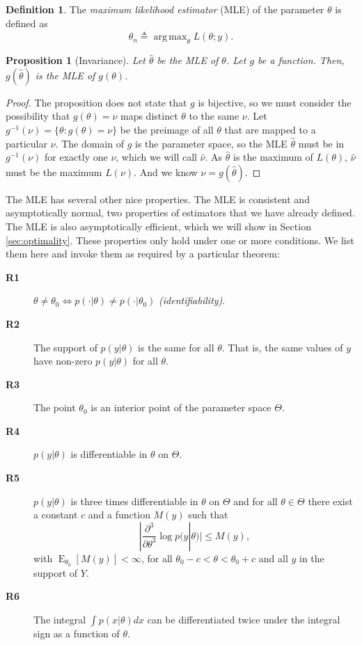 \documentclass{book}
\theoremstyle{plain}%
\newtheorem{proposition}{Proposition}[section]
\theoremstyle{definition}
\newtheorem{definition}{Definition}[section]
\DeclareMathOperator{\E}{E}
\newlength{\arrow}
\DeclareMathOperator*{\argmax}{arg\,max}
\begin{document}
\begin{definition}
The \textit{maximum likelihood estimator} (MLE) of the parameter $\theta$ is defined as $$\hat{\theta}_n \triangleq \displaystyle\argmax_\theta L(\theta;y).$$
\end{definition}

\begin{proposition}[Invariance]
Let $\hat{\theta}$ be the MLE of $\theta$. Let $g$ be a function. Then, $g(\hat{\theta})$ is the MLE of $g(\theta)$.
\end{proposition}

\begin{proof}
The proposition does not state that $g$ is bijective, so we must consider the possibility that $g(\theta) = \nu$ maps distinct $\theta$ to the same $\nu$. Let $g^{-1}(\nu) = \{\theta: g(\theta) = \nu\}$ be the preimage of all $\theta$ that are mapped to a particular $\nu$. The domain of $g$ is the parameter space, so the MLE $\hat{\theta}$ must be in $g^{-1}(\nu)$ for exactly one $\nu$, which we will call $\hat{\nu}$. As $\hat{\theta}$ is the maximum of $L(\theta)$, $\hat{\nu}$ must be the maximum $L(\nu)$. And we know $\hat{\nu} = g(\hat{\theta})$.
\end{proof}

The MLE has several other nice properties. The MLE is consistent and asymptotically normal, two properties of estimators that we have already defined. The MLE is also asymptotically efficient, which we will show in Section \ref{sec:optimality}. These properties only hold under one or more conditions. We list them here and invoke them as required by a particular theorem:

\begin{description}
\item[\textbf{R1}] $\theta \neq \theta_0 \Leftrightarrow p(\cdot|\theta) \neq p(\cdot|\theta_0)$ \emph{(identifiability)}.
\item[\textbf{R2}] The support of $p(y|\theta)$ is the same for all $\theta$. That is, the same values of $y$ have non-zero $p(y|\theta)$ for all $\theta$.
\item[\textbf{R3}] The point $\theta_0$ is an interior point of the parameter space $\Theta$.
\item[\textbf{R4}] $p(y|\theta)$ is differentiable in $\theta$ on $\Theta$.
\item[\textbf{R5}] $p(y|\theta)$ is three times differentiable in $\theta$ on $\Theta$ and for all $\theta \in \Theta$ there exist a constant $c$ and a function $M(y)$ such that $$|\frac{\partial^3}{\partial \theta^3} \log p(y|\theta)| \leq M(y),$$
with $\E_{\theta_0}[M(y)] < \infty$, for all $\theta_0 - c < \theta < \theta_0 + c$ and all $y$ in the support of $Y$.
\item[\textbf{R6}] The integral $\int p(x|\theta)dx$ can be differentiated twice under the integral sign as a function of $\theta$.
\end{description}
\end{document}
